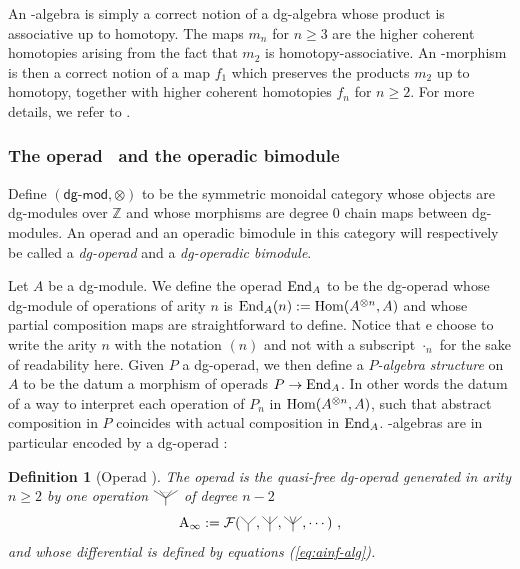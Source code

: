 \documentclass[twoside, 12pt]{amsart}
\newtheorem{definition}{Definition}[section]
\theoremstyle{remark}
\begin{document}
An \Ainf -algebra is simply a correct notion of a dg-algebra whose product is associative up to homotopy. The maps $m_n$ for $n \geq 3$ are the higher coherent homotopies arising from the fact that $m_2$ is homotopy-associative. An \Ainf -morphism is then a correct notion of a map $f_1$ which preserves the products $m_2$ up to homotopy, together with higher coherent homotopies $f_n$ for $n \geq 2$. For more details, we refer to \cite[Chapter 9]{LodayVallette12}. 

\subsubsection{The operad \Ainf\ and the operadic bimodule \Minf} \label{sss:operad-ainf-operadic-bimod-minf}

Define $(\mathsf{dg\text{-}mod},\otimes)$ to be the symmetric monoidal category whose objects are dg-modules over $\mathbb{Z}$ and whose morphisms are degree 0 chain maps between dg-modules.
An operad and an operadic bimodule in this category will respectively be called a \emph{dg-operad} and a \emph{dg-operadic bimodule}.

Let $A$ be a dg-module. We define the operad $\mathrm{End}_A$ to be the dg-operad whose dg-module of operations of arity $n$ is $\mathrm{End}_A(n) := \mathrm{Hom} (A^{\otimes n},A)$ and whose partial composition maps are straightforward to define.
Notice that e choose to write the arity $n$ with the notation $(n)$ and not with a subscript $\cdot_n$ for the sake of readability here.
Given $P$ a dg-operad, we then define a \emph{$P$-algebra structure} on $A$ to be the datum a morphism of operads $P \rightarrow \mathrm{End}_A$. In other words the datum of a way to interpret each operation of $P_n$ in $\mathrm{Hom} (A^{\otimes n},A)$, such that abstract composition in $P$ coincides with actual composition in $\mathrm{End}_A$.
\Ainf -algebras are in particular encoded by a dg-operad : 

\begin{definition}[Operad \Ainf]
The \emph{operad \Ainf} is the quasi-free dg-operad generated in arity $n \geqslant 2$ by one operation $\arbreop{0.15}$ of degree $n-2$ 
\[ \Ainf := \mathcal{F}( \arbreopdeux , \arbreoptrois, \arbreopquatre , \cdots ) \ , \]
and whose differential is defined by equations (\ref{eq:ainf-alg}).
\end{definition}
\end{document}
